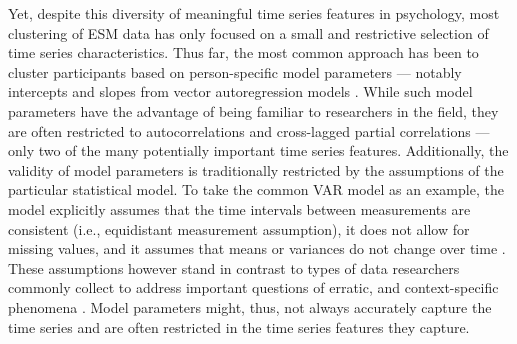 \documentclass[man, 12pt, a4paper, floatsintext]{apa7}
\theoremstyle{break}
\theoremstyle{plain}
\begin{document}
Yet, despite this diversity of meaningful time series features in psychology, most clustering of ESM data has only focused on a small and restrictive selection of time series characteristics. Thus far, the most common approach has been to cluster participants based on person-specific model parameters --- notably intercepts and slopes from vector autoregression models \citep[VAR; e.g.,][]{ariens2020, bulteel2016, stefanovic2022}. While such model parameters have the advantage of being familiar to researchers in the field, they are often restricted to autocorrelations and cross-lagged partial correlations \citep[e.g.,][]{bringmann2018c} --- only two of the many potentially important time series features. Additionally, the validity of model parameters is traditionally restricted by the assumptions of the particular statistical model. To take the common VAR model as an example, the model explicitly assumes that the time intervals between measurements are consistent (i.e., equidistant measurement assumption), it does not allow for missing values, and it assumes that means or variances do not change over time \citep[i.e., stationarity assumption;][]{lutkepohl2005}. These assumptions however stand in contrast to types of data researchers commonly collect to address important questions of erratic, and context-specific phenomena \citep[][]{myin-germeys2018, hamaker2017, kivela2022, helmich2020a}. Model parameters might, thus, not always accurately capture the time series and are often restricted in the time series features they capture.


\end{document}
